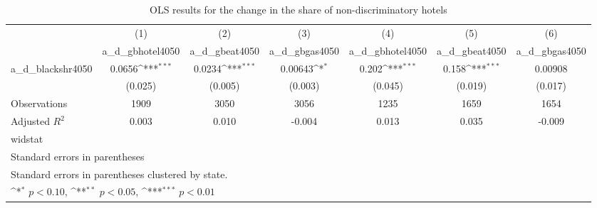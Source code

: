 \begin{table}[htbp]\centering
\def\sym#1{\ifmmode^{#1}\else\(^{#1}\)\fi}
\caption{OLS results for the change in the share of non-discriminatory hotels}
\begin{tabular}{l*{6}{c}}
\hline\hline
                    &\multicolumn{1}{c}{(1)}&\multicolumn{1}{c}{(2)}&\multicolumn{1}{c}{(3)}&\multicolumn{1}{c}{(4)}&\multicolumn{1}{c}{(5)}&\multicolumn{1}{c}{(6)}\\
                    &\multicolumn{1}{c}{a\_d\_gbhotel4050}&\multicolumn{1}{c}{a\_d\_gbeat4050}&\multicolumn{1}{c}{a\_d\_gbgas4050}&\multicolumn{1}{c}{a\_d\_gbhotel4050}&\multicolumn{1}{c}{a\_d\_gbeat4050}&\multicolumn{1}{c}{a\_d\_gbgas4050}\\
\hline
a\_d\_blackshr4050    &      0.0656\sym{***}&      0.0234\sym{***}&     0.00643\sym{*}  &       0.202\sym{***}&       0.158\sym{***}&     0.00908         \\
                    &     (0.025)         &     (0.005)         &     (0.003)         &     (0.045)         &     (0.019)         &     (0.017)         \\
\hline
Observations        &        1909         &        3050         &        3056         &        1235         &        1659         &        1654         \\
Adjusted \(R^{2}\)  &       0.003         &       0.010         &      -0.004         &       0.013         &       0.035         &      -0.009         \\
widstat             &                     &                     &                     &                     &                     &                     \\
\hline\hline
\multicolumn{7}{l}{\footnotesize Standard errors in parentheses}\\
\multicolumn{7}{l}{\footnotesize Standard errors in parentheses clustered by state.}\\
\multicolumn{7}{l}{\footnotesize \sym{*} \(p<0.10\), \sym{**} \(p<0.05\), \sym{***} \(p<0.01\)}\\
\end{tabular}
\end{table}
